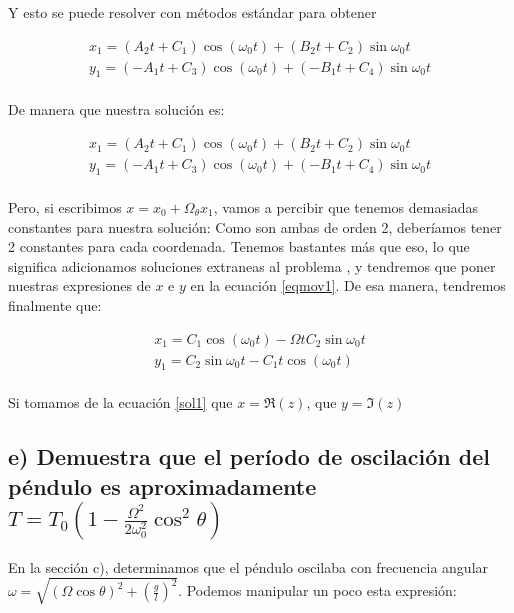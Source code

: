 \documentclass[a4paper,12pt]{article}
\begin{document}
Y esto se puede resolver con métodos estándar para obtener 

\begin{equation}
\begin{aligned}
  x_1 = (A_2 t + C_1) \cos(\omega_0 t) + (B_2 t +  C_2) \sin{\omega_0 t}\\
  y_1 = (-A_1 t + C_3) \cos(\omega_0 t) + (-B_1 t +  C_4) \sin{\omega_0 t}\\
\end{aligned}
\end{equation}

De manera que nuestra solución es:

\begin{equation}
\begin{aligned}
  x_1 = (A_2 t + C_1) \cos(\omega_0 t) + (B_2 t +  C_2) \sin{\omega_0 t}\\
  y_1 = (-A_1 t + C_3) \cos(\omega_0 t) + (-B_1 t +  C_4) \sin{\omega_0 t}\\
\end{aligned}
\end{equation}

Pero, si escribimos $x = x_0 + \Omega_\theta x_1 $, vamos a percibir que tenemos demasiadas constantes para nuestra solución: Como son ambas de orden 2, deberíamos tener 2 constantes para cada coordenada. Tenemos bastantes más que eso, lo que significa adicionamos soluciones extraneas al problema , y tendremos que poner nuestras expresiones de $x$ e $y$ en la ecuación \eqref{eqmov1}. De esa manera, tendremos finalmente que:

\begin{equation}
\begin{aligned}
  x_1 = C_1 \cos(\omega_0 t) - \Omega t C_2 \sin{\omega_0 t}\\
  y_1 = C_2 \sin{\omega_0 t}-C_1 t \cos(\omega_0 t) \\
\end{aligned}
\end{equation}

Si tomamos de la ecuación \eqref{sol1} que $x = \Re(z)$, que $y = \Im(z)$
\subsection*{e) Demuestra que el período de oscilación del péndulo es aproximadamente $T = T_{0}(1-\frac{\Omega^2}{2\omega^2_0}\cos^2\theta) $}

En la sección c), determinamos que el péndulo oscilaba con frecuencia angular $\omega = \sqrt{(\Omega\cos\theta)^2 + \left(\frac{g}{l}\right)^2}$. Podemos manipular un poco esta expresión:
\end{document}
